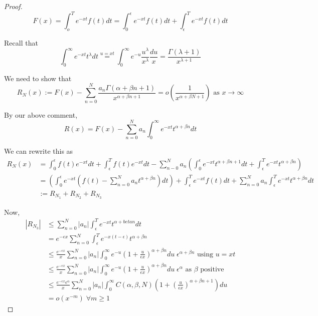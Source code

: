 \documentclass[a4paper]{article}
\begin{document}
\begin{proof}
	\[
		F(x) = \int_{o}^{T} e^{-xt}f(t) dt = \int_{0}^{\epsilon}e^{-xt} f(t) dt + \int_{\epsilon}^{T} e^{-xt}f(t) dt
	\]

	Recall that  \[
		\int_{0}^{\infty} e^{-xt} t^{\lambda} dt \overset{u=xt}{=} \int_{0}^{\infty} e^{-u} \frac{u^{\lambda}}{x^{\lambda}} \frac{du}{x} = \frac{\Gamma(\lambda + 1)}{x^{\lambda + 1}}
	\] 

	We need to show that 
	\[
		R_N(x) := F(x) - \sum_{n=0}^{N} \frac{a_n \Gamma(\alpha + \beta n + 1)}{x^{\alpha + \beta n + 1}} = o\left( \frac{1}{x^{\alpha + \beta N+ 1}} \right) \text{ as } x\to \infty
	\]

	By our above comment,
	\[
		R(x) = F(x) - \sum_{n=0}^{N} a_n \int_{0}^{\infty} e^{-xt} t^{\alpha + \beta n} dt
	\]

	We can rewrite this as
         \begin{align*}
		 R_N(x) &= \int_{0}^{\epsilon} f(t) e^{-xt}dt + \int_{\epsilon}^{T} f(t) e^{-xt} dt - \sum_{n-0}^{N}a_n \left( \int_{0}^{\epsilon} e^{-xt}t^{\alpha + \beta n +1} dt + \int_{\epsilon}^{T} e^{-xt} t^{\alpha + \beta n} \right) \\
		 &= \left( \int_{0}^{\epsilon} e^{-xt} \left(f(t) - \sum_{n=0}^{N} a_n t^{\alpha+\beta n}\right) dt \right) + \int_{\epsilon}^{T} e^{-xt}f(t)dt + \sum_{n=0}^{N} a_n \int_{\epsilon}^{T} e^{-xt}t^{\alpha + \beta n} dt \\
		 &:= R_{N_1} + R_{N_2} + R_{N_3}
         \end{align*}

	 Now,
	 \begin{align*}
		 |R_{N_3}| &\le \sum_{n=0}^{N} |a_n| \int_{\epsilon}^{T} e^{-xt} t^{\alpha + beta n}dt \\
		 &= e^{-\epsilon x} \sum_{n=0}^{N} \int_{\epsilon}^{T} e^{-x(t-\epsilon)} t^{\alpha + \beta n} \\
		 &\le  \frac{e^{-\epsilon x}}{x} \sum_{n=0}^{N} |a_n| \int_{0}^{\infty} e^{-u} \left(1+\frac{u}{\epsilon x}\right)^{\alpha + \beta n} du \; \epsilon^{\alpha + \beta n} \text{ using $u = xt$}\\
		 &\le \frac{e^{-\epsilon x}}{x} \sum_{n=0}^{N} |a_n| \int_{0}^{\infty} e^{-u} \left(1+\frac{u}{\epsilon x}\right)^{\alpha + \beta n} du \; \epsilon^{\alpha} \text{ as $\beta$ positive} \\
		 &\le \frac{e^{-\epsilon x} \epsilon^{\alpha}}{x} \sum_{n=0}^{N}|a_n| \int_{0}^{\infty} C(\alpha, \beta, N) \left( 1 + \left( \frac{u}{\epsilon x} \right)^{\alpha + \beta n + 1}  \right)du \\
		 &=o(x^{-m}) \; \forall m\ge 1
	 \end{align*}


\end{proof}
\end{document}
